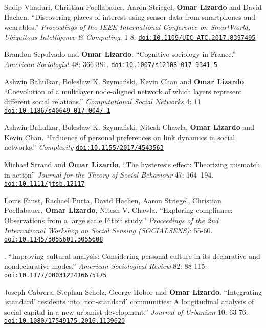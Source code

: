 
\ind Sudip Vhaduri, Christian Poellabauer, Aaron Striegel, {\bf Omar Lizardo} and David Hachen. ``Discovering places of interest using sensor data from smartphones and wearables.'' {\em Proceedings of the IEEE International Conference on SmartWorld, Ubiquitous Intelligence \& Computing}: 1-8. \href{https://doi.org/10.1109/UIC-ATC.2017.8397495}{\nolinkurl{doi:10.1109/UIC-ATC.2017.8397495}}

\ind Brandon Sepulvado and {\bf Omar Lizardo}. ``Cognitive sociology in France.'' {\em American Sociologist} 48: 366-381. 
\href{https://doi.org/10.1007/s12108-017-9341-5}{\nolinkurl{doi:10.1007/s12108-017-9341-5}}

\ind Ashwin Bahulkar, Boles\l{}aw K. Szyma\'{n}ski, Kevin Chan and {\bf Omar Lizardo}. ``Coevolution of a multilayer node-aligned network of which layers represent different social relations.'' {\em Computational Social Networks} 4: 11 \href{https://doi.org/10.1186/s40649-017-0047-1}{\nolinkurl{doi:10.1186/s40649-017-0047-1}} 

\ind Ashwin Bahulkar, Boles\l{}aw K. Szyma\'{n}ski, Nitesh Chawla, {\bf Omar Lizardo} and Kevin Chan. ``Influence of personal preferences on link dynamics in social networks.'' {\em Complexity} \href{https://doi.org/10.1155/2017/4543563}{\nolinkurl{doi:10.1155/2017/4543563}}

\ind Michael Strand and {\bf Omar Lizardo}. ``The hysteresis effect: Theorizing mismatch in action'' {\em Journal for the Theory of Social Behaviour} 47: 164–194. \href{https://doi.org/10.1111/jtsb.12117}{\nolinkurl{doi:10.1111/jtsb.12117}}

\ind Louis Faust, Rachael Purta, David Hachen, Aaron Striegel, Christian Poellabauer, {\bf Omar Lizardo}, Nitesh V. Chawla. ``Exploring compliance: Observations from a large scale Fitbit study.'' {\em Proceedings of the 2nd International Workshop on Social Sensing (SOCIALSENS)}: 55-60. \href{https://doi.org/10.1145/3055601.3055608}{\nolinkurl{doi:10.1145/3055601.3055608}}

. ``Improving cultural analysis: Considering personal culture in its declarative and nondeclarative modes.'' {\em American Sociological Review} 82: 88-115. \href{https://doi.org/10.1177/0003122416675175}{\nolinkurl{doi:10.1177/0003122416675175}} 

\ind Joseph Cabrera, Stephan Scholz, George Hobor and {\bf Omar Lizardo}. ``Integrating `standard' residents into `non-standard' communities: A longitudinal analysis of social capital in a new urbanist development.''  {\em Journal of Urbanism} 10: 63-76. \href{https://doi.org/10.1080/17549175.2016.1139620}{\nolinkurl{doi:10.1080/17549175.2016.1139620}}